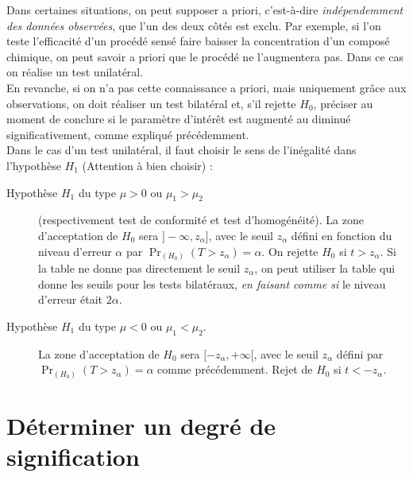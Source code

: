 \documentclass[12pt, a4paper]{book}
\numberwithin{equation}{section}
\begin{document}
Dans certaines situations, on peut supposer a priori, c'est-à-dire \emph{indépendemment des données observées}, que l'un des deux côtés est exclu. Par exemple, si l'on teste l'efficacité d'un procédé sensé faire baisser la concentration d'un composé chimique, on peut savoir a priori que le procédé ne l'augmentera pas. Dans ce cas on réalise un test unilatéral. \\
En revanche, si on n'a pas cette connaissance a priori, mais uniquement grâce aux observations, on doit réaliser un test bilatéral et, s'il rejette $H_0$, préciser au moment de conclure si le paramètre d'intérêt est augmenté au diminué significativement, comme expliqué précédemment. \\
Dans le cas d'un test unilatéral, il faut choisir le sens de l'inégalité dans l'hypothèse $H_1$ (Attention à bien choisir) :
\begin{description}
 \item[Hypothèse $H_1$ du type $\mu> 0$ ou $\mu_1>\mu_2$] 
 (respectivement test de conformité et test d'homogénéité). La zone d'acceptation de $H_0$ sera $]-\infty, z_\alpha]$, avec le seuil $z_\alpha$ défini en fonction du niveau d'erreur $\alpha$ par $\Pr_{(H_0)}(T>z_\alpha)=\alpha$. On rejette $H_0$ si $t>z_\alpha$. Si la table ne donne pas directement le seuil $z_\alpha$, on peut utiliser la table qui donne les seuils pour les tests bilatéraux, \emph{en faisant comme si} le niveau d'erreur était $2\alpha$.
 \item[Hypothèse $H_1$ du type $\mu< 0$ ou $\mu_1<\mu_2$.] La zone d'acceptation de $H_0$ sera $[-z_\alpha, +\infty[$, avec le seuil $z_\alpha$ défini par $\Pr_{(H_0)}(T>z_\alpha)=\alpha$ comme précédemment. Rejet de $H_0$ si $t<-z_\alpha$. 
\end{description}

\section{Déterminer un degré de signification}
\end{document}
